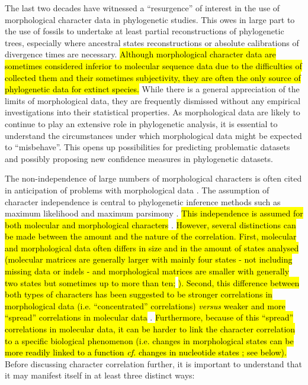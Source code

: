 \documentclass[12pt,letterpaper]{article}
\begin{document}
The last two decades have witnessed a ``resurgence'' of interest in the use of morphological character data in phylogenetic studies.
This owes in large part to the use of fossils to undertake at least partial reconstructions of phylogenetic trees, especially where ancestral states reconstructions or absolute calibrations of divergence times are necessary. 
\hl{Although morphological character data are sometimes considered inferior to molecular sequence data due to the difficulties of collected them and their sometimes subjectivity, they are often the only source of phylogenetic data for extinct species.}
While there is a general appreciation of the limits of morphological data, they are frequently dismissed without any empirical investigations into their statistical properties.
As morphological data are likely to continue to play an extensive role in phylogenetic analysis, it is essential to understand the circumstances under which morphological data might be expected to ``misbehave''.
This opens up possibilities for predicting problematic datasets and possibly proposing new confidence measures in phylogenetic datasets.

The non-independence of large numbers of morphological characters is often cited in anticipation of problems with morphological data \cite[e.g.][]{Davalos01072014, ZouConvergence}.
The assumption of character independence is central to phylogenetic inference methods such as maximum likelihood and maximum parsimony \citep[e.g.][]{joysey1982problems,felsenstein1985phylogenies,lewisa2001,felsenstein2004inferring}.
\hl{This independence is assumed for both molecular and morphological characters} \citep{huelsenbeck1999effect,Davalos01072014,ZouConvergence}.
\hl{However, several distinctions can be made between the amount and the nature of the correlation.
First, molecular and morphological data often differs in size and in the amount of states analysed (molecular matrices are generally larger with mainly four states - not including missing data or indels - and morphological matrices are smaller with generally two states but sometimes up to more than ten;}
\citealt{Guillerme2016146}
\hl{).
Second, this difference between both types of characters has been suggested to be stronger correlations in morphological data (i.e. ``concentrated'' correlations) \textit{versus} weaker and more ``spread'' correlations in molecular data}
\citep[\hl{i.e. ``diffused'' correlations - though some regions of the genome can be thought as more correlated than others}][]{huelsenbeck1999effect}.
\hl{Furthermore, because of this ``spread'' correlations in molecular data, it can be harder to link the character correlation to a specific biological phenomenon (i.e. changes in morphological states can be more readily linked to a function \textit{cf.} changes in nucleotide states ; see below).}
Before discussing character correlation further, it is important to understand that it may manifest itself in at least three distinct ways:
\end{document}
